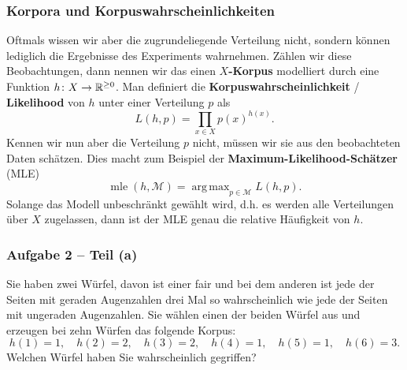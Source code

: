 \documentclass{beamer}
\DeclareMathOperator*{\argmax}{arg\,max}
\begin{document}
\begin{frame} \frametitle{Korpora und Korpuswahrscheinlichkeiten}
	\justifying \footnotesize
	Oftmals wissen wir aber die zugrundeliegende Verteilung nicht, sondern können lediglich die Ergebnisse des Experiments wahrnehmen. Zählen wir diese Beobachtungen, dann nennen wir das einen \textbf{$X$-Korpus} modelliert durch eine Funktion $h \colon X \to \mathbb{R}^{\ge 0}$.
	Man definiert die \textbf{Korpuswahrscheinlichkeit} / \textbf{Likelihood} von $h$ unter einer Verteilung $p$ als
	\begin{equation*}
		L(h,p) = \prod_{x \in X} p(x)^{h(x)} .
	\end{equation*} 
	Kennen wir nun aber die Verteilung $p$ nicht, müssen wir sie aus den beobachteten Daten schätzen. Dies macht zum Beispiel der \textbf{Maximum-Likelihood-Schätzer} (MLE)
	\begin{equation*}
		\operatorname{mle}(h,\mathcal{M}) = \argmax_{p \in \mathcal{M}} L(h,p) .
	\end{equation*}
	Solange das Modell unbeschränkt gewählt wird, d.h. es werden alle Verteilungen über $X$ zugelassen, dann ist der MLE genau die relative Häufigkeit von $h$.
\end{frame}

\begin{frame} \frametitle{Aufgabe 2 -- Teil (a)}
	\justifying \small
	Sie haben zwei Würfel, davon ist einer fair und bei dem anderen ist jede der Seiten mit geraden Augenzahlen drei Mal so wahrscheinlich wie jede der Seiten mit ungeraden Augenzahlen. Sie wählen einen der beiden Würfel aus und erzeugen bei zehn Würfen das folgende Korpus:
	\begin{equation*}
		h(1) = 1, \quad h(2) = 2, \quad h(3) = 2, \quad h(4) = 1, \quad h(5) = 1, \quad h(6) = 3.
	\end{equation*}
	Welchen Würfel haben Sie wahrscheinlich gegriffen?	
\end{frame}
\end{document}
